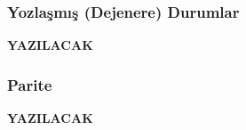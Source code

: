 \documentclass[a4paper,12pt, twoside]{article}
\newcommand{\YAZILACAK}{{\vspace{18pt}\bf\Large \color{red} YAZILACAK}}
\begin{document}
\subsubsection{Yozlaşmış (Dejenere) Durumlar}

\YAZILACAK

\subsubsection{Parite}

\YAZILACAK


\newpage
\renewcommand\refname{Kaynaklar}
{}
 
\end{document}

